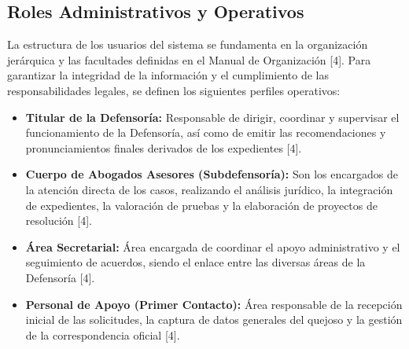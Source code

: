 \subsection{Roles Administrativos y Operativos}
La estructura de los usuarios del sistema se fundamenta en la organización jerárquica y las facultades definidas en el Manual de Organización [4]. Para garantizar la integridad de la información y el cumplimiento de las responsabilidades legales, se definen los siguientes perfiles operativos:
\begin{itemize}
    \item \textbf{Titular de la Defensoría:} Responsable de dirigir, coordinar y supervisar el funcionamiento de la Defensoría, así como de emitir las recomendaciones y pronunciamientos finales derivados de los expedientes [4].
    \item \textbf{Cuerpo de Abogados Asesores (Subdefensoría):} Son los encargados de la atención directa de los casos, realizando el análisis jurídico, la integración de expedientes, la valoración de pruebas y la elaboración de proyectos de resolución [4].
    \item \textbf{Área Secretarial:} Área encargada de coordinar el apoyo administrativo y el seguimiento de acuerdos, siendo el enlace entre las diversas áreas de la Defensoría [4].
    \item \textbf{Personal de Apoyo (Primer Contacto):} Área responsable de la recepción inicial de las solicitudes, la captura de datos generales del quejoso y la gestión de la correspondencia oficial [4].
\end{itemize}

